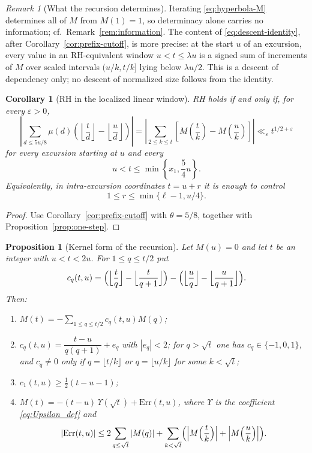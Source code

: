 \documentclass[11pt]{amsart}
\numberwithin{equation}{section}
\theoremstyle{plain}
\newtheorem{proposition}[theorem]{Proposition}
\newtheorem{corollary}[theorem]{Corollary}
\theoremstyle{definition}
\theoremstyle{remark}
\newtheorem{remark}[theorem]{Remark}
\newcommand{\eps}{\varepsilon}
\begin{document}
\begin{remark}[What the recursion determines]
\label{rem:recursion-content}
Iterating \eqref{eq:hyperbola-M} determines all of $M$ from $M(1)=1$, so
determinacy alone carries no information; cf.\
Remark~\ref{rem:information}.  The content of
\eqref{eq:descent-identity}, after Corollary~\ref{cor:prefix-cutoff}, is
more precise: at the start $u$ of an excursion, every value in an
RH-equivalent window $u<t\le\lambda u$ is a signed sum of increments of
$M$ over scaled intervals $(u/k,t/k]$ lying below $\lambda u/2$.  This is a
descent of dependency only; no descent of normalized size follows from the
identity.
\end{remark}

\begin{corollary}[RH in the localized linear window]
\label{cor:linear-window-RH}
RH holds if and only if, for every $\eps>0$,
\[
\left|\sum_{d\le5u/8}\mu(d)\left(\left\lfloor\frac td\right\rfloor
-\left\lfloor\frac ud\right\rfloor\right)\right|
=\left|\sum_{2\le k\le t}\left[M\left(\frac tk\right)-M\left(\frac uk\right)\right]\right|
\ll_\eps t^{1/2+\eps}
\]
for every excursion starting at $u$ and every
\[
u<t\le\min\left\{x_1,\frac54u\right\}.
\]
Equivalently, in intra-excursion coordinates $t=u+r$ it is enough to
control
\[
1\le r\le\min\{\ell-1,u/4\}.
\]
\end{corollary}

\begin{proof}
Use Corollary~\ref{cor:prefix-cutoff} with $\theta=5/8$, together with
Proposition~\ref{prop:one-step}.
\end{proof}

\begin{proposition}[Kernel form of the recursion]
\label{prop:kernel}
Let $M(u)=0$ and let $t$ be an integer with $u<t<2u$. For $1\le q\le t/2$ put
\[
c_q(t,u)=\Bigl(\Bigl\lfloor\frac tq\Bigr\rfloor-\Bigl\lfloor\frac t{q+1}\Bigr\rfloor\Bigr)
-\Bigl(\Bigl\lfloor\frac uq\Bigr\rfloor-\Bigl\lfloor\frac u{q+1}\Bigr\rfloor\Bigr).
\]
Then:
\begin{enumerate}[label=\textup{(\roman*)}]
\item $M(t)=-\sum_{1\le q\le t/2}c_q(t,u)M(q)$;
\item $c_q(t,u)=\dfrac{t-u}{q(q+1)}+e_q$ with $|e_q|<2$; for $q>\sqrt t$
one has $c_q\in\{-1,0,1\}$, and $c_q\ne0$ only if $q=\lfloor t/k\rfloor$ or
$q=\lfloor u/k\rfloor$ for some $k<\sqrt t$;
\item $c_1(t,u)\ge\frac12(t-u-1)$;
\item $M(t)=-(t-u)\,\Upsilon(\sqrt t)+\mathrm{Err}(t,u)$, where $\Upsilon$ is the
coefficient \eqref{eq:Upsilon_def} and
\[
|\mathrm{Err}(t,u)|\le2\sum_{q\le\sqrt t}|M(q)|
+\sum_{k<\sqrt t}\Bigl(\Bigl|M\Bigl(\frac tk\Bigr)\Bigr|+\Bigl|M\Bigl(\frac uk\Bigr)\Bigr|\Bigr).
\]
\end{enumerate}
\end{proposition}
\end{document}
